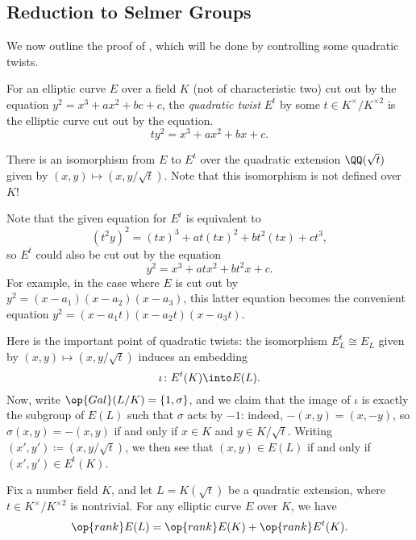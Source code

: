 \documentclass[../notes.tex]{subfiles}
\begin{document}
\subsection{Reduction to Selmer Groups}
We now outline the proof of , which will be done by controlling some quadratic twists.
\begin{definition}
	For an elliptic curve $E$ over a field $K$ (not of characteristic two) cut out by the equation $y^2=x^3+ax^2+bc+c$, the \textit{quadratic twist} $E^t$ by some $t\in K^\times/K^{\times2}$ is the elliptic curve cut out by the equation.
	\[ty^2=x^3+ax^2+bx+c.\]
\end{definition}
\begin{remark}
	There is an isomorphism from $E$ to $E^t$ over the quadratic extension $\QQ(\sqrt t)$ given by $(x,y)\mapsto(x,y/\sqrt t)$. Note that this isomorphism is not defined over $K$!
\end{remark}
\begin{remark}
	Note that the given equation for $E^t$ is equivalent to
	\[\left(t^2y\right)^2=(tx)^3+at(tx)^2+bt^2(tx)+ct^3,\]
	so $E^t$ could also be cut out by the equation
	\[y^2=x^3+atx^2+bt^2x+c.\]
	For example, in the case where $E$ is cut out by $y^2=(x-a_1)(x-a_2)(x-a_3)$, this latter equation becomes the convenient equation $y^2=(x-a_1t)(x-a_2t)(x-a_3t)$.
\end{remark}
\begin{remark} \label{rem:decompose-quadratic-jump}
	Here is the important point of quadratic twists: the isomorphism $E^t_L\cong E_L$ given by $(x,y)\mapsto(x,y/\sqrt t)$ induces an embedding
	\[\iota\colon E^t(K)\into E(L).\]
	Now, write $\op{Gal}(L/K)=\{1,\sigma\}$, and we claim that the image of $\iota$ is exactly the subgroup of $E(L)$ such that $\sigma$ acts by $-1$: indeed, $-(x,y)=(x,-y)$, so $\sigma(x,y)=-(x,y)$ if and only if $x\in K$ and $y\in K/\sqrt t$. Writing $(x',y')\coloneqq(x,y/\sqrt t)$, we then see that $(x,y)\in E(L)$ if and only if $(x',y')\in E^t(K)$.
\end{remark}
\begin{lemma} \label{lem:rank-jump-twist}
	Fix a number field $K$, and let $L=K(\sqrt t)$ be a quadratic extension, where $t\in K^\times/K^{\times2}$ is nontrivial. For any elliptic curve $E$ over $K$, we have
	\[\op{rank}E(L)=\op{rank}E(K)+\op{rank}E^t(K).\]
\end{lemma}
\end{document}
